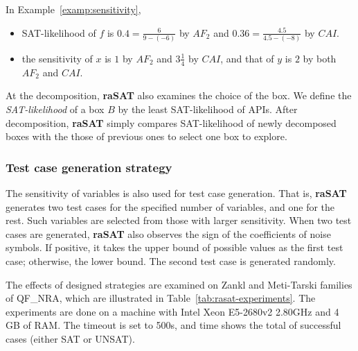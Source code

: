 \documentclass[runningheads,a4paper,oribibl]{llncs}
\begin{document}
\begin{example} \label{examp:SATlikelihood}
In Example~\ref{examp:sensitivity}, 
\begin{itemize}
\item SAT-likelihood of $f$ is $0.4= \frac{6}{9-(-6)}$ by $AF_2$ 
and $0.36 = \frac{4.5}{4.5-(-8)}$ by $CAI$. 
\item the sensitivity of $x$ is $1$ by $AF_2$ and $3\frac{1}{4}$ by $CAI$,
  and that of $y$ is $2$ by both $AF_2$ and $CAI$. 
\end{itemize}
\end{example}


At the decomposition, {\bf raSAT} also examines the choice of the box.
We define the {\em SAT-likelihood} of a box $B$ by 
the least SAT-likelihood of APIs. After decomposition, {\bf raSAT} simply compares SAT-likelihood of newly decomposed boxes with the those of previous ones to select one box to explore.

\subsubsection*{Test case generation strategy}
\sloppy
The sensitivity of variables is also used for test case generation.
That is, {\bf raSAT} generates two test cases for the specified number of variables,
and one for the rest. 
Such variables are selected from those with larger sensitivity.
When two test cases are generated, {\bf raSAT} also observes
the sign of the coefficients of noise symbols.
If positive, it takes the upper bound of possible values as the first test case; 
otherwise, the lower bound. The second test case is generated randomly. 

The effects of designed strategies are examined on Zankl and Meti-Tarski families of QF\_NRA, which are illustrated in
Table~\ref{tab:rasat-experiments}. 
The experiments are done on a machine with Intel Xeon E5-2680v2 2.80GHz and 4 GB of RAM. The timeout is set to 500s, and time shows the total of successful cases 
(either SAT or UNSAT). %
\end{document}
